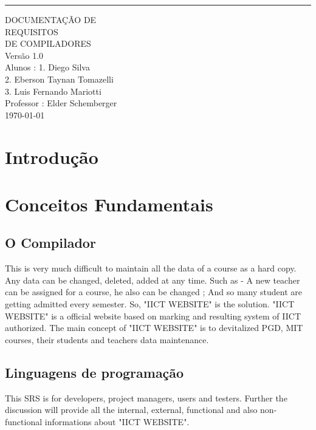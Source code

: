 \documentclass{scrreprt}
\date{}
\def\myversion{1.0 }
\begin{document}
\begin{flushright}
    \rule{16cm}{5pt}\vskip1cm
    \begin{bfseries}
        \Huge{DOCUMENTAÇÃO DE\\ REQUISITOS}\\
        \vspace{1.5cm}
        DE COMPILADORES\\
        \vspace{1.5cm}
        \LARGE{Versão \myversion}\\
        \vspace{1.5cm}
        Alunos : 1. Diego Silva\\
        2. Eberson Taynan Tomazelli\\
        3. Luis Fernando Mariotti\\
        \vspace{1.5cm}
        Professor : Elder Schemberger \\
        \vspace{1.5cm}
        \today\\
    \end{bfseries}
\end{flushright}

\renewcommand{\contentsname}{Índice}

\tableofcontents

\chapter{Introdução}

\chapter{Conceitos Fundamentais}

\section{O Compilador}
This is very much difficult to maintain all the data of a course as a hard copy. Any data can be changed, deleted, added at any time. Such as - A new teacher can be assigned for a course, he also can be changed ; And so many student are getting admitted every semester. So, "IICT WEBSITE" is the solution. "IICT WEBSITE" is a official website based on marking and resulting system of IICT authorized. The main concept of "IICT WEBSITE" is to devitalized PGD, MIT courses, their students and teachers data maintenance. 

\section{Linguagens de programação}
This SRS is for developers, project managers, users and testers. Further the discussion will provide all the internal, external, functional and also non-functional informations about "IICT WEBSITE".
\end{document}
